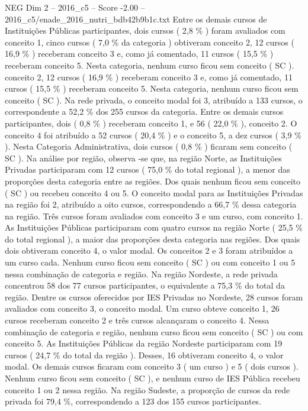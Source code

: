 \begin{textsample}{NEG Dim 2 – 2016\_c5 – Score -2.00 – 2016\_c5/enade\_2016\_nutri\_bdb42b9b1c.txt}
Entre os demais cursos de Instituições Públicas participantes, dois cursos ( 2,8 \% ) foram avaliados com conceito 1, cinco cursos ( 7,0 \% da categoria ) obtiveram conceito 2, 12 cursos ( 16,9 \% ) receberam conceito 3 e, como já comentado, 11 cursos ( 15,5 \% ) receberam conceito 5.
Nesta categoria, nenhum curso ficou sem conceito ( SC ). conceito 2, 12 cursos ( 16,9 \% ) receberam conceito 3 e, como já comentado, 11 cursos ( 15,5 \% ) receberam conceito 5.
Nesta categoria, nenhum curso ficou sem conceito ( SC ).
Na rede privada, o conceito modal foi 3, atribuído a 133 cursos, o correspondente a 52,2 \% dos 255 cursos da categoria.
Entre os demais cursos participantes, dois ( 0,8 \% ) receberam conceito 1, e 56 ( 22,0 \% ), conceito 2.
O conceito 4 foi atribuído a 52 cursos ( 20,4 \% ) e o conceito 5, a dez cursos ( 3,9 \% ).
Nesta Categoria Administrativa, dois cursos ( 0,8 \% ) ficaram sem conceito ( SC ).
Na análise por região, observa -se que, na região Norte, as Instituições Privadas participaram com 12 cursos ( 75,0 \% do total regional ), a menor das proporções desta categoria entre as regiões.
Dos quais nenhum ficou sem conceito ( SC ) ou recebeu conceito 4 ou 5.
O conceito modal para as Instituições Privadas na região foi 2, atribuído a oito cursos, correspondendo a 66,7 \% dessa categoria na região.
Três cursos foram avaliados com conceito 3 e um curso, com conceito 1.
As Instituições Públicas participaram com quatro cursos na região Norte ( 25,5 \% do total regional ), a maior das proporções desta categoria nas regiões.
Dos quais dois obtiveram conceito 4, o valor modal.
Os conceitos 2 e 3 foram atribuídos a um curso cada.
Nenhum curso ficou sem conceito ( SC ) ou com conceito 1 ou 5 nessa combinação de categoria e região.
Na região Nordeste, a rede privada concentrou 58 dos 77 cursos participantes, o equivalente a 75,3 \% do total da região.
Dentre os cursos oferecidos por IES Privadas no Nordeste, 28 cursos foram avaliados com conceito 3, o conceito modal.
Um curso obteve conceito 1, 26 cursos receberam conceito 2 e três cursos alcançaram o conceito 4.
Nessa combinação de categoria e região, nenhum curso ficou sem conceito ( SC ) ou com conceito 5.
As Instituições Públicas da região Nordeste participaram com 19 cursos ( 24,7 \% do total da região ).
Desses, 16 obtiveram conceito 4, o valor modal.
Os demais cursos ficaram com conceito 3 ( um curso ) e 5 ( dois cursos ).
Nenhum curso ficou sem conceito ( SC ), e nenhum curso de IES Pública recebeu conceito 1 ou 2 nessa região.
Na região Sudeste, a proporção de cursos da rede privada foi 79,4 \%, correspondendo a 123 dos 155 cursos participantes.

\end{textsample}
